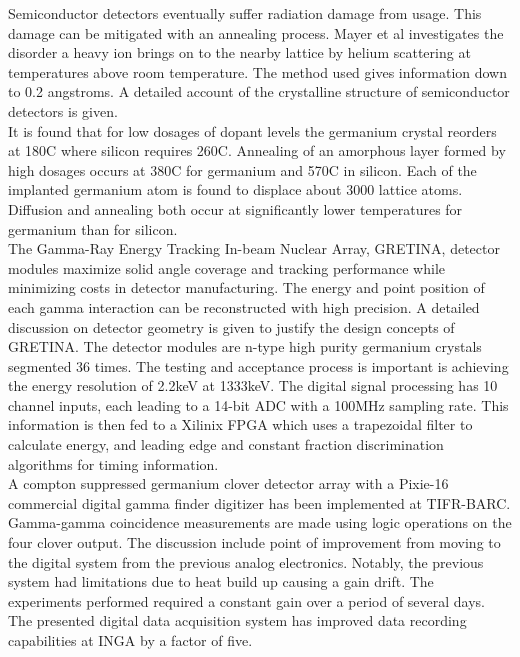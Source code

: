 \documentclass[12pt]{article}
\begin{document}
\begin{doublespacing}
{\large\textbf{\cite{Mayer}}}

Semiconductor detectors eventually suffer radiation damage from usage. This damage can be mitigated with an annealing process. Mayer et al investigates the disorder a heavy ion brings on to the nearby lattice by helium scattering at temperatures above room temperature. The method used gives information down to 0.2 angstroms. A detailed account of the crystalline structure of semiconductor detectors is given.
\\
It is found that for low dosages of dopant levels the germanium crystal reorders at 180C where silicon requires 260C. Annealing of an amorphous layer formed by high dosages occurs at 380C for germanium and 570C in silicon. Each of the implanted germanium atom is found to displace about 3000 lattice atoms. Diffusion and annealing both occur at significantly lower temperatures for germanium than for silicon.
\\[20pt]


{\large\textbf{\cite{Paschalis201344}}}
The Gamma-Ray Energy Tracking In-beam Nuclear Array, GRETINA, detector modules maximize solid angle coverage and tracking performance while minimizing costs in detector manufacturing. The energy and point position of each gamma interaction can be reconstructed with high precision. A detailed discussion on detector geometry is given to justify the design concepts of GRETINA. The detector modules are n-type high purity germanium crystals segmented 36 times. The testing and acceptance process is important is achieving the energy resolution of 2.2keV at 1333keV. The digital signal processing has 10 channel inputs, each leading to a 14-bit ADC with a 100MHz sampling rate. This information is then fed to a Xilinix FPGA which uses a trapezoidal filter to calculate energy, and leading edge and constant fraction discrimination algorithms for timing information.
\\[20pt]


{\large\textbf{\cite{Palit201290}}}
A compton suppressed germanium clover detector array with a Pixie-16 commercial digital gamma finder digitizer has been implemented at TIFR-BARC. Gamma-gamma coincidence measurements are made using logic operations on the four clover output. The discussion include point of improvement from moving to the digital system from the previous analog electronics. Notably, the previous system had limitations due to heat build up causing a gain drift. The experiments performed required a constant gain over a period of several days. The presented digital data acquisition system has improved data recording capabilities at INGA by a factor of five.
\\[20pt]



\end{doublespacing}
\end{document}
